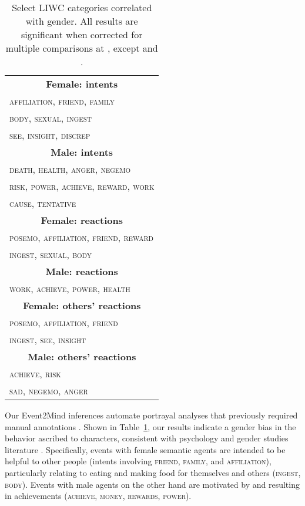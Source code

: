 \documentclass[11pt,a4paper]{article}
\begin{document}
\begin{table}[ht]
\centering



\begin{tabular}{p{}}
\toprule
\multicolumn{1}{c}{\textbf{Female: intents}}         \\
\textsc{affiliation, friend, family} \\
\textsc{body, sexual, ingest}\\
\textsc{see, insight, discrep}\\
\multicolumn{1}{c}{\textbf{Male: intents}}           \\
\textsc{death, health, anger, negemo}                        \\
\textsc{risk, power, achieve, reward, work}       \\
\textsc{cause, tentative}       \\
\midrule
\multicolumn{1}{c}{\textbf{Female: reactions}}       \\ 
\textsc{posemo, affiliation, friend, reward}   \\
\textsc{ingest, sexual, body}                   \\
\multicolumn{1}{c}{\textbf{Male: reactions}}         \\ 
\textsc{work, achieve, power, health}                        \\
\midrule
\multicolumn{1}{c}{\textbf{Female: others' reactions}}\\ 
\textsc{posemo, affiliation, friend}  \\
\textsc{ingest, see, insight}\\
\multicolumn{1}{c}{\textbf{Male: others' reactions}}\\ 
\textsc{achieve, risk} \\
\textsc{sad, negemo, anger} \\
\bottomrule
\end{tabular}

\caption{Select LIWC categories correlated with gender. All results are significant when corrected for multiple comparisons at , except  and .
}
\label{tab:LIWCmovies}
\end{table}

Our Event2Mind inferences automate portrayal analyses that previously required manual annotations \cite{behm2008mean,prentice2002women,england2011gender}.
Shown in Table~\ref{tab:LIWCmovies},
our results indicate a  gender bias in the behavior ascribed to characters, consistent with psychology and gender studies literature \cite{collins2011content}. 
Specifically, events with female semantic agents are intended to be helpful to other people (intents involving \textsc{friend}, \textsc{family}, and \textsc{affiliation}), particularly relating to eating and making food for themselves and others (\textsc{ingest}, \textsc{body}).
Events with male agents on the other hand are motivated by and resulting in achievements (\textsc{achieve}, \textsc{money}, \textsc{rewards}, \textsc{power}).
\end{document}
